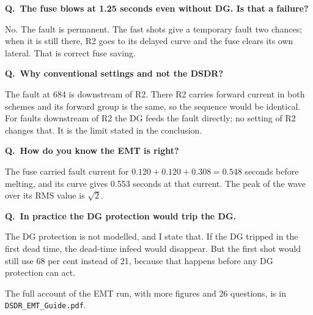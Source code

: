 \documentclass[11pt,a4paper]{article}
\newcommand{\q}[1]{\par\needspace{4\baselineskip}\medskip\noindent\textbf{Q.\ #1}\par\noindent}
\begin{document}
\q{The fuse blows at 1.25 seconds even without DG. Is that a failure?}
No. The fault is permanent. The fast shots give a temporary fault two chances; when it is still there, R2
goes to its delayed curve and the fuse clears its own lateral. That is correct fuse saving.

\q{Why conventional settings and not the DSDR?}
The fault at 684 is downstream of R2. There R2 carries forward current in both schemes and its forward group
is the same, so the sequence would be identical. For faults downstream of R2 the DG feeds the fault directly;
no setting of R2 changes that. It is the limit stated in the conclusion.

\q{How do you know the EMT is right?}
The fuse carried fault current for $0.120 + 0.120 + 0.308 = 0.548$ seconds before melting, and its curve
gives 0.553 seconds at that current. The peak of the wave over its RMS value is $\sqrt{2}$.

\q{In practice the DG protection would trip the DG.}
The DG protection is not modelled, and I state that. If the DG tripped in the first dead time, the dead-time
infeed would disappear. But the first shot would still use 68 per cent instead of 21, because that happens
before any DG protection can act.

\medskip
{\small The full account of the EMT run, with more figures and 26 questions, is in
\texttt{DSDR\_EMT\_Guide.pdf}.}
\end{document}
